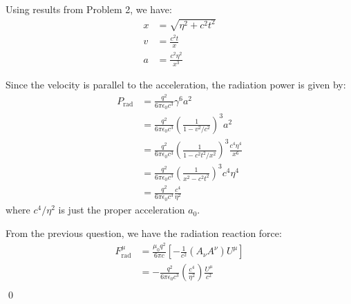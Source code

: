 \documentclass[12pt]{article}
\begin{document}
Using results from Problem 2, we have:
\begin{equation}
    \begin{split}
        x &= \sqrt{\eta^{2} + c^{2} t^{2}} \\
        v &= \frac{c^{2} t}{x} \\
        a &= \frac{c^{2} \eta^{2}}{x^{3}}
    \end{split}
\end{equation}

Since the velocity is parallel to the acceleration, the radiation power is given by:
\begin{equation}
    \begin{split}
        P_{\text{rad}} &= \frac{q^{2}}{6\pi \epsilon_{0} c^{3}} \gamma^{6} a^{2} \\
        &= \frac{q^{2}}{6\pi \epsilon_{0} c^{3}} \left( \frac{1}{1 - v^{2}/c^{2}} \right)^{3} a^{2} \\
        &= \frac{q^{2}}{6\pi \epsilon_{0} c^{3}} \left( \frac{1}{1 - c^{2} t^{2}/x^{2}} \right)^{3} \frac{c^{4} \eta^{4}}{x^{6}} \\
        &= \frac{q^{2}}{6\pi \epsilon_{0} c^{3}} \left( \frac{1}{x^{2} - c^{2} t^{2}} \right)^{3} c^{4} \eta^{4} \\
        &= \frac{q^{2}}{6\pi \epsilon_{0} c^{3}} \frac{c^{4}}{\eta^{2}}
    \end{split}
\end{equation}
where $c^{4}/\eta^{2}$ is just the proper acceleration $a_{0}$.

From the previous question, we have the radiation reaction force:
\begin{equation}
    \begin{split}
        F^{\mu}_{\text{rad}} &= \frac{\mu_{0}q^{2}}{6\pi c} \left[ -\frac{1}{c^{2}} (A_{\nu} A^{\nu}) U^{\mu} \right] \\
        &= -\frac{q^{2}}{6\pi \epsilon_{0} c^{3}} \left( \frac{c^{4}}{\eta^{2}} \right) \frac{U^{\mu}}{c^{2}}\\
    \end{split}
\end{equation}
\qed
\end{document}
